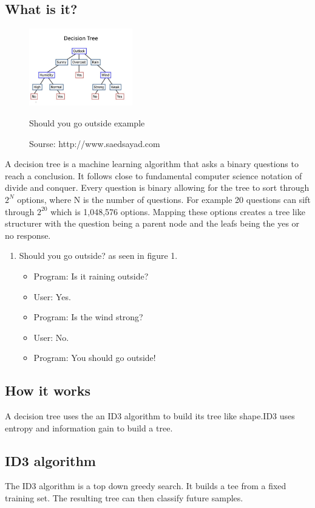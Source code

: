 \documentclass[a4paper]{article}
\begin{document}
\subsection{What is it?}
\begin{figure}
\centering
\includegraphics[width=0.4\textwidth]{Decision_Tree.jpg}
\caption{Sourse: http://www.saedsayad.com}
Should you go outside example
\end{figure}
A decision tree is a machine learning algorithm that asks a binary questions to reach a conclusion. It follows close to fundamental computer science notation of divide and conquer. Every question is binary allowing for the tree to sort through $2^N$ options, where N is the number of questions. For example 20 questions can sift through $2^{20}$ which is 1,048,576 options. Mapping these options creates a tree like structurer with the question being a parent node and the leafs being the yes or no response.
\begin{enumerate}
\centering
\item Should you go outside? as seen in figure 1.
\begin{itemize}
  \centering
  \item Program: Is it raining outside?
  \item User: Yes.
  \item Program: Is the wind strong?
  \item User: No.
  \item Program: You should go outside!
\end{itemize}
\end{enumerate}
\subsection{How it works}
A decision tree uses the an ID3 algorithm to build its tree like shape.ID3 uses entropy and information gain to build a tree.
\subsection{ID3 algorithm}
The ID3 algorithm is a top down greedy search. It builds a tee from a fixed training set. The resulting tree can then classify future samples.
\end{document}
